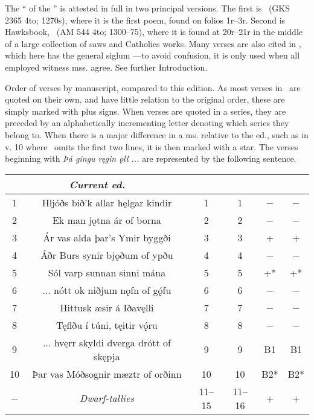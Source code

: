 

{\small The “ of the ” is attested in full in two principal versions. The first is \Regius\ (GKS 2365 4to; 1270s), where it is the first poem, found on folios 1r–3r. Second is Hawksbook, \Hauksbok\ (AM 544 4to; 1300–75), where it is found at 20r–21r in the middle of a large collection of saws and Catholics works. Many verses are also cited in \Gylfaginning, which here has the general siglum \GylfMS—to avoid confusion, it is only used when all employed witness mss. agree. See further Introduction. %

Order of verses by manuscript, compared to this edition. As most verses in \GylfMS\ are quoted on their own, and have little relation to the original order, these are simply marked with plus signs. When verses are quoted in a series, they are preceded by an alphabetically incrementing letter denoting which series they belong to. When there is a major difference in a ms. relative to the ed., such as in v. 10 where \GylfMS\ omits the first two lines, it is then marked with a star. The verses beginning with \emph{Þá gingu ręgin ǫll ...} are represented by the following sentence.
\begin{longtable}{|c c c c c c|}
	\hline
	\multicolumn{2}{|c}{\emph{Current ed.}} & \Regius & \Hauksbok & \RegiusProse\Trajectinus\Wormianus & \Upsaliensis \\ [0.5ex]
	\hline\hline
	1 & Hljóðs bið’k allar hęlgar kindir & 1 & 1 & − & − \\
	2 & Ek man jǫtna ár of borna & 2 & 2 & − & − \\
	3 & Ár vas alda þar’s Ymir byggði & 3 & 3 & + & + \\
	4 & Áðr Burs synir bjǫðum of ypðu & 4 & 4 & − & − \\
	5 & Sól varp sunnan sinni mána & 5 & 5 & +* & +* \\
	6 & ... nótt ok niðjum nǫfn of gǫ́fu & 6 & 6 & − & − \\
	7 & Hittusk æsir á Iðavęlli & 7 & 7 & − & − \\
	8 & Tęflðu í túni, tęitir vǫ́ru & 8 & 8 & − & − \\
	9 & ... hvęrr skyldi dverga drótt of skępja & 9 & 9 & B1 & B1 \\
	10 & Þar vas Móðsognir mæztr of orðinn & 10 & 10 & B2* & B2* \\
	− & \emph{Dwarf-tallies} & 11–15 & 11–16 & + & + \\

\end{longtable}}
